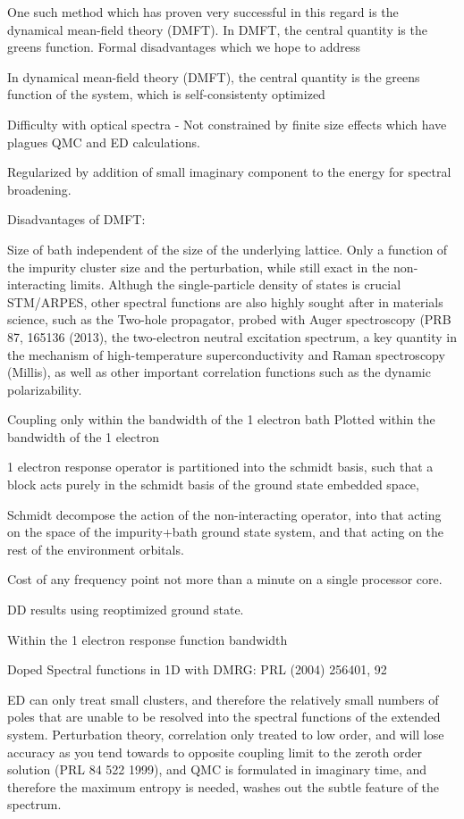 \documentclass[aps,showpacs,twocolumn,nobibnotes]{revtex4}
\begin{document}
One such method which has proven very successful in this regard is the dynamical mean-field theory (DMFT). In DMFT, the central quantity is the
greens function. 
    Formal disadvantages which we hope to address



In dynamical mean-field theory (DMFT), the central quantity is the greens function of the system, which is self-consistenty optimized 

Difficulty with optical spectra - 
Not constrained by finite size effects which have plagues QMC and ED calculations.

Regularized by addition of small imaginary component to the energy for spectral broadening.

Disadvantages of DMFT:

Size of bath independent of the size of the underlying lattice. Only a function of the impurity cluster size and the perturbation, while still exact in the non-interacting limits.
Althugh the single-particle density of states is crucial STM/ARPES, other spectral functions are also highly sought after in materials science, such as the 
Two-hole propagator, probed with Auger spectroscopy (PRB 87, 165136 (2013), the two-electron neutral excitation spectrum, a key quantity in the mechanism of high-temperature superconductivity and Raman spectroscopy (Millis), as well as other important correlation functions such as the dynamic polarizability.

Coupling only within the bandwidth of the 1 electron bath
Plotted within the bandwidth of the 1 electron 

1 electron response operator is partitioned into the schmidt basis, such that a block acts purely in the schmidt basis of the ground state embedded space, 

Schmidt decompose the action of the non-interacting operator, into that acting on the space of the impurity+bath ground state system, and that acting on the rest of the environment orbitals.

Cost of any frequency point not more than a minute on a single processor core.

DD results using reoptimized ground state.

Within the 1 electron response function bandwidth

Doped Spectral functions in 1D with DMRG: PRL (2004) 256401, 92

ED can only treat small clusters, and therefore the relatively small numbers of poles that are unable to be resolved into the spectral functions of the extended system. Perturbation theory, 
correlation only treated to low order, and will 
lose accuracy as you tend towards to opposite coupling limit to the zeroth order solution (PRL 84 522 1999), and QMC is formulated in imaginary time, and therefore the maximum entropy is needed,
washes out the subtle feature of the spectrum.
\end{document}
